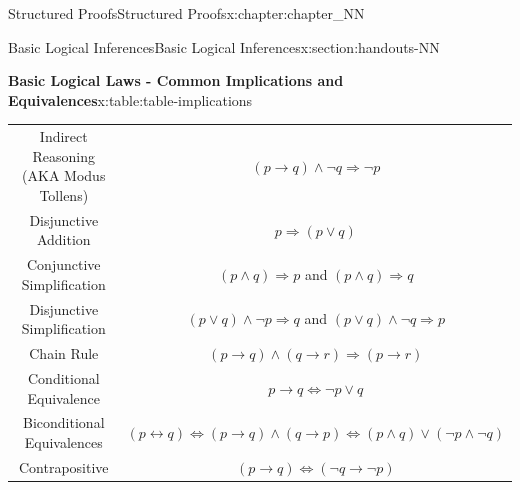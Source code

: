 \documentclass[oneside,10pt,]{book}
\numberwithin{equation}{section}
\newcommand{\hrulemedium}{\noalign{\hrule height 0.07em}}
\begin{document}
\begin{chapterptx}{Structured Proofs}{}{Structured Proofs}{}{}{x:chapter:chapter_NN}
\begin{sectionptx}{Basic Logical Inferences}{}{Basic Logical Inferences}{}{}{x:section:handouts-NN}
\begin{tableptx}{\textbf{Basic Logical Laws - Common Implications and Equivalences}}{x:table:table-implications}{}
{\begin{tabular}{cc}
Indirect Reasoning (AKA Modus Tollens)&\((p \to  q) \land  \neg q \Rightarrow  \neg p\)\tabularnewline\hrulemedium
Disjunctive Addition&\(p\Rightarrow (p\lor q)\)\tabularnewline\hrulemedium
Conjunctive Simplification&\((p \land  q) \Rightarrow  p\) and \((p \land  q) \Rightarrow  q\)\tabularnewline\hrulemedium
Disjunctive Simplification&\((p \lor  q) \land  \neg p \Rightarrow  q\) and \((p \lor q) \land \neg q\Rightarrow p\)\tabularnewline\hrulemedium
Chain Rule&\((p \to  q) \land  ( q \rightarrow  r) \Rightarrow  (p\to  r)\)\tabularnewline\hrulemedium
Conditional Equivalence&\(p \rightarrow  q \Leftrightarrow  \neg p \lor  q\)\tabularnewline\hrulemedium
Biconditional Equivalences&\((p \leftrightarrow  q) \Leftrightarrow  (p\rightarrow q) \land  (q \rightarrow  p)\Leftrightarrow (p \land  q) \lor  (\neg p \land  \neg q)\)\tabularnewline\hrulemedium
Contrapositive&\((p\to q) \Leftrightarrow (\neg q \to \neg p)\)
\end{tabular}
}%
\end{tableptx}%
\end{sectionptx}
\end{chapterptx}
%
%
\typeout{************************************************}
\typeout{************************************************}
%
\end{document}
